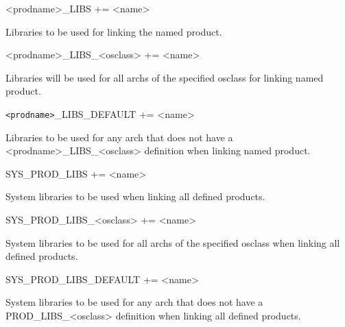\begin{description}\item \textless{}prodname\textgreater{}\_LIBS += \textless{}name\textgreater{}

\end{description}Libraries to be used for linking the named product.

\begin{description}\item \textless{}prodname\textgreater{}\_LIBS\_\textless{}osclass\textgreater{} += \textless{}name\textgreater{}

\end{description}Libraries will be used for all archs of the specified osclass for linking named product.

\begin{description}\item \verb|<prodname>|\_LIBS\_DEFAULT += \textless{}name\textgreater{}

\end{description}Libraries to be used for any arch that does not have a \textless{}prodname\textgreater{}\_LIBS\_\textless{}osclass\textgreater{} definition when linking 
named product.



\begin{description}\item {}SYS\_PROD\_LIBS += \textless{}name\textgreater{}

\end{description}System libraries to be used when linking all defined products.

\begin{description}\item SYS\_PROD\_LIBS\_\textless{}osclass\textgreater{} += \textless{}name\textgreater{}

\end{description}System libraries to be used for all archs of the specified osclass when linking all defined products.

\begin{description}\item SYS\_PROD\_LIBS\_DEFAULT += \textless{}name\textgreater{}

\end{description}System libraries to be used for any arch that does not have a PROD\_LIBS\_\textless{}osclass\textgreater{} definition when 
linking all defined products.



